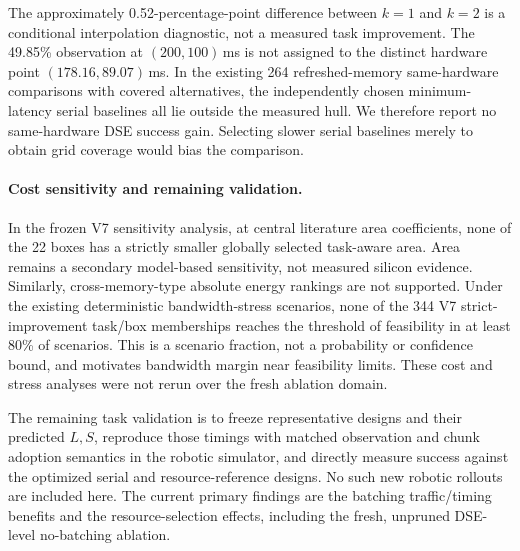The approximately 0.52-percentage-point difference between $k=1$ and $k=2$
is a conditional interpolation diagnostic, not a measured task improvement.
The 49.85\% observation at $(200,100)$\,ms is not assigned to the distinct
hardware point $(178.16,89.07)$\,ms. In the existing 264 refreshed-memory
same-hardware comparisons with covered alternatives, the independently chosen
minimum-latency serial baselines all lie outside the measured hull. We
therefore report no same-hardware DSE success gain. Selecting slower serial
baselines merely to obtain grid coverage would bias the comparison.

\paragraph{Cost sensitivity and remaining validation.}
In the frozen V7 sensitivity analysis, at central literature area coefficients,
none of the 22 boxes has a strictly
smaller globally selected task-aware area. Area remains a secondary
model-based sensitivity, not measured silicon evidence. Similarly,
cross-memory-type absolute energy rankings are not supported. Under the
existing deterministic bandwidth-stress scenarios, none of the 344
V7 strict-improvement task/box memberships reaches the threshold of feasibility
in at least 80\% of scenarios. This is a scenario fraction, not a probability
or confidence bound, and motivates bandwidth margin near feasibility limits.
These cost and stress analyses were not rerun over the fresh ablation domain.

The remaining task validation is to freeze representative designs and their
predicted $L,S$, reproduce those timings with matched observation and chunk
adoption semantics in the robotic simulator, and directly measure success
against the optimized serial and resource-reference designs. No such new
robotic rollouts are included here. The current primary findings are the
batching traffic/timing benefits and the resource-selection effects, including
the fresh, unpruned DSE-level no-batching ablation.
